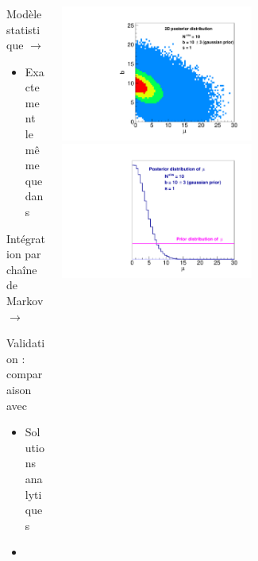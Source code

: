 \begin{frame}
\frametitle{\tifosi}

\vspace*{-0.8cm}
\begin{columns}
\begin{column}{0.5\textwidth}
\begin{block}{}
\begin{maliste}
\item Modèle statistique $\rightarrow$ \roofit
\begin{itemize}
\item Exactement le même que dans \OTH
\end{itemize}
\item Intégration  par chaîne de Markov $\rightarrow$ \roostats
\item Validation : comparaison avec
\begin{itemize}
\item Solutions analytiques
\item \OTH
\end{itemize}
\end{maliste}
\end{block}
\end{column}

\begin{column}{0.5\textwidth}

\begin{center}
\includegraphics[width=0.55\textwidth]{Figures/Stat/Posterior2DPoissonWithUncertainBkg.pdf}
\includegraphics[width=0.55\textwidth]{Figures/Stat/PosteriorSignalPoissonWithUncertainBkg.pdf}
\end{center}


\end{column}
\end{columns}
\end{frame}

